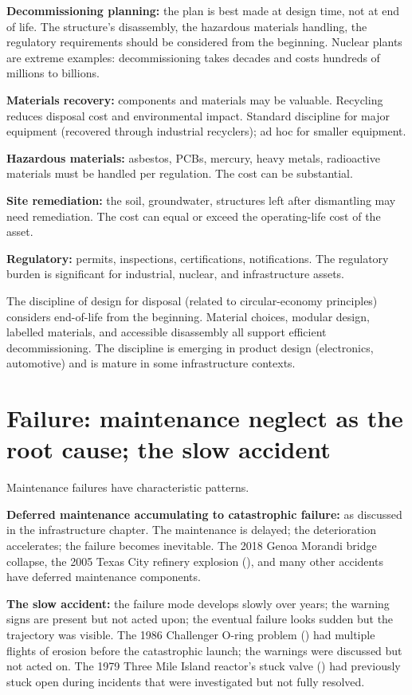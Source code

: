 \textbf{Decommissioning planning:} the plan is best made at design time, not at end of life. The structure's disassembly, the hazardous materials handling, the regulatory requirements should be considered from the beginning. Nuclear plants are extreme examples: decommissioning takes decades and costs hundreds of millions to billions.

\textbf{Materials recovery:} components and materials may be valuable. Recycling reduces disposal cost and environmental impact. Standard discipline for major equipment (recovered through industrial recyclers); ad hoc for smaller equipment.

\textbf{Hazardous materials:} asbestos, PCBs, mercury, heavy metals, radioactive materials must be handled per regulation. The cost can be substantial.

\textbf{Site remediation:} the soil, groundwater, structures left after dismantling may need remediation. The cost can equal or exceed the operating-life cost of the asset.

\textbf{Regulatory:} permits, inspections, certifications, notifications. The regulatory burden is significant for industrial, nuclear, and infrastructure assets.

The discipline of design for disposal (related to circular-economy principles) considers end-of-life from the beginning. Material choices, modular design, labelled materials, and accessible disassembly all support efficient decommissioning. The discipline is emerging in product design (electronics, automotive) and is mature in some infrastructure contexts.

\section{Failure: maintenance neglect as the root cause; the slow accident}

Maintenance failures have characteristic patterns.

\textbf{Deferred maintenance accumulating to catastrophic failure:} as discussed in the infrastructure chapter. The maintenance is delayed; the deterioration accelerates; the failure becomes inevitable. The 2018 Genoa Morandi bridge collapse, the 2005 Texas City refinery explosion (\cite{acc:csb-bp-texas-city-2007}), and many other accidents have deferred maintenance components.

\textbf{The slow accident:} the failure mode develops slowly over years; the warning signs are present but not acted upon; the eventual failure looks sudden but the trajectory was visible. The 1986 Challenger O-ring problem (\cite{acc:nasa-challenger}) had multiple flights of erosion before the catastrophic launch; the warnings were discussed but not acted on. The 1979 Three Mile Island reactor's stuck valve (\cite{acc:kemeny-tmi-1979}) had previously stuck open during incidents that were investigated but not fully resolved.

